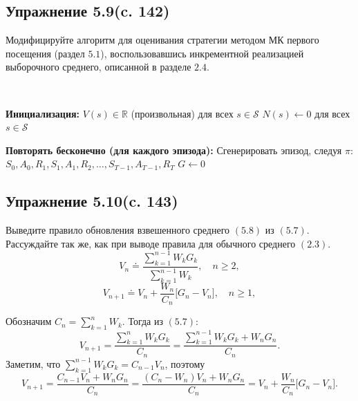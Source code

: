 \subsection{Упражнение 5.9(c. 142)}
Модифицируйте алгоритм для оценивания стратегии методом МК первого посещения (раздел $5.1$), воспользовавшись инкрементной реализацией выборочного среднего, описанной в разделе $2.4$.
\begin{solution}
    \leavevmode\\
    \begin{algorithm}[H]
    \SetAlgoLined
    \DontPrintSemicolon
    \caption{Предсказание методом МК первого посещения для оценивания $V \approx v_\pi$ (инкрементная версия)}


    \textbf{Инициализация:}\;
    \Indp
    $V(s) \in \mathbb{R}$ (произвольная) для всех $s \in \mathcal{S}$\;
    $N(s) \leftarrow 0$ для всех $s \in \mathcal{S}$\;
    \Indm

    \BlankLine
    \textbf{Повторять бесконечно (для каждого эпизода):}\;
    \Indp
    Сгенерировать эпизод, следуя $\pi$: $S_0, A_0, R_1, S_1, A_1, R_2, \ldots, S_{T-1}, A_{T-1}, R_T$\;
    $G \leftarrow 0$\;
    \Indm

    \end{algorithm}
\end{solution}

\subsection{Упражнение 5.10(c. 143)}
Выведите правило обновления взвешенного среднего $(5.8)$ из
$(5.7)$. Рассуждайте так же, как при выводе правила для обычного среднего $(2.3)$.
\begin{equation}
    V_n \doteq \frac{\sum_{k=1}^{n-1} W_k G_k}{\sum_{k=1}^{n-1} W_k}, \quad n \geq 2,
    \tag{5.7}
\end{equation}
\begin{equation}
    V_{n+1} \doteq V_n + \frac{W_n}{C_n}\bigl[G_n - V_n\bigr], \quad n \geq 1,
    \tag{5.8}
\end{equation}
\begin{solution}
    Обозначим $C_n = \sum_{k=1}^{n} W_k$. Тогда из $(5.7)$:
    \[
    V_{n+1} = \frac{\sum_{k=1}^{n} W_k G_k}{C_n} = \frac{\sum_{k=1}^{n-1} W_k G_k + W_n G_n}{C_n}.
    \]
    Заметим, что $\sum_{k=1}^{n-1} W_k G_k = C_{n-1} V_n$, поэтому
    \[
    V_{n+1} = \frac{C_{n-1} V_n + W_n G_n}{C_n} = \frac{(C_n - W_n) V_n + W_n G_n}{C_n} = V_n + \frac{W_n}{C_n}\bigl[G_n - V_n\bigr].
    \]
\end{solution}

